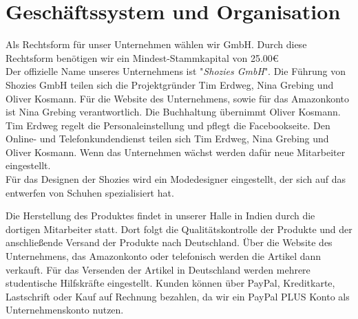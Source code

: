 \chapter{Geschäftssystem und Organisation}
\label{cha:5}
Als Rechtsform für unser Unternehmen wählen wir GmbH. Durch diese Rechtsform benötigen wir ein Mindest-Stammkapital von 25.00€\\
Der offizielle Name unseres Unternehmens ist "\textit{Shozies GmbH}".
Die Führung von Shozies GmbH teilen sich die Projektgründer Tim Erdweg, Nina Grebing und Oliver Kosmann. Für die Website des Unternehmens, sowie für das Amazonkonto ist Nina Grebing verantwortlich. Die Buchhaltung übernimmt Oliver Kosmann. Tim Erdweg regelt die Personaleinstellung und pflegt die Facebookseite. Den Online- und Telefonkundendienst teilen sich Tim Erdweg, Nina Grebing und Oliver Kosmann. Wenn das Unternehmen wächst werden dafür neue Mitarbeiter eingestellt.\\
Für das Designen der Shozies wird ein Modedesigner eingestellt, der sich auf das entwerfen von Schuhen spezialisiert hat.

Die Herstellung des Produktes findet in unserer Halle in Indien durch die dortigen Mitarbeiter statt. Dort folgt die Qualitätskontrolle der Produkte und der anschließende Versand der Produkte nach Deutschland. Über die Website des Unternehmens, das Amazonkonto oder telefonisch werden die Artikel dann verkauft.
Für das Versenden der Artikel in Deutschland werden mehrere studentische Hilfskräfte eingestellt.
Kunden können über PayPal, Kreditkarte, Lastschrift oder Kauf auf Rechnung bezahlen, da wir ein PayPal PLUS Konto als Unternehmenskonto nutzen.


